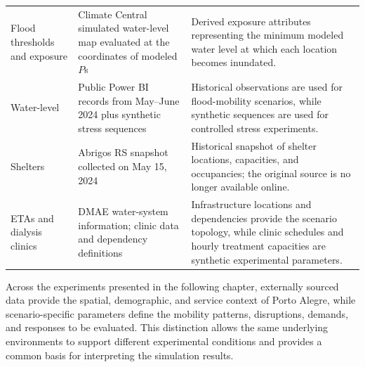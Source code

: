 \begin{table}[ht]
\begin{tabularx}{\linewidth}{@{}p{3.5cm}p{6.2cm}X@{}}
Flood thresholds and exposure
& Climate Central simulated water-level map evaluated at the coordinates of modeled $P$s
& Derived exposure attributes representing the minimum modeled water level at which each location becomes inundated.\\

Water-level
& Public Power BI records from May--June 2024 plus synthetic stress sequences
& Historical observations are used for flood-mobility scenarios, while synthetic sequences are used for controlled stress experiments.\\

Shelters
& Abrigos RS snapshot collected on May 15, 2024
& Historical snapshot of shelter locations, capacities, and occupancies; the original source is no longer available online. \\

ETAs and dialysis clinics
& DMAE water-system information; clinic data and dependency definitions
& Infrastructure locations and dependencies provide the scenario topology, while clinic schedules and hourly treatment capacities are synthetic experimental parameters. \\
\bottomrule
\end{tabularx}
\end{table}

Across the experiments presented in the following chapter, externally sourced data provide the spatial, demographic, and service context of Porto Alegre, while scenario-specific parameters define the mobility patterns, disruptions, demands, and responses to be evaluated. This distinction allows the same underlying environments to support different experimental conditions and provides a common basis for interpreting the simulation results.




    

